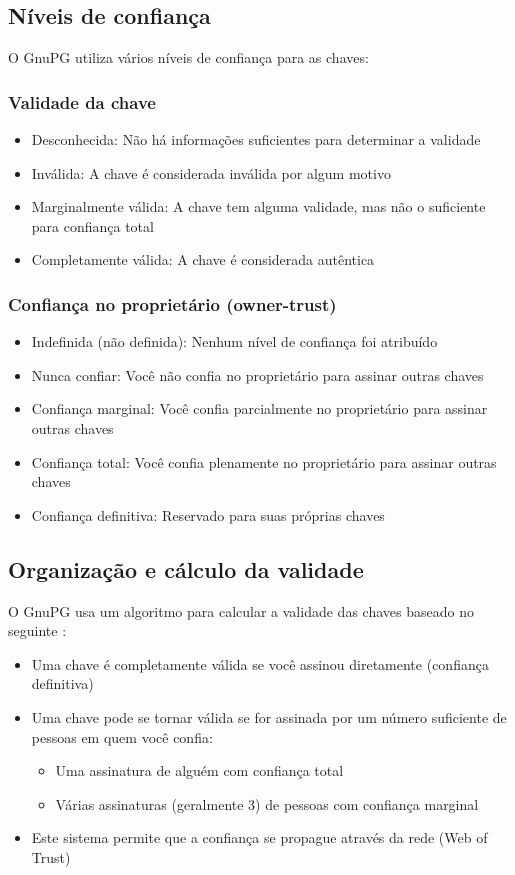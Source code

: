 \subsection{Níveis de confiança}
O GnuPG utiliza vários níveis de confiança para as chaves:

\subsubsection{Validade da chave}
\begin{itemize}
    \item Desconhecida: Não há informações suficientes para determinar a validade
    \item Inválida: A chave é considerada inválida por algum motivo
    \item Marginalmente válida: A chave tem alguma validade, mas não o suficiente para confiança total
    \item Completamente válida: A chave é considerada autêntica
\end{itemize}

\subsubsection{Confiança no proprietário (owner-trust)}
\begin{itemize}
    \item Indefinida (não definida): Nenhum nível de confiança foi atribuído
    \item Nunca confiar: Você não confia no proprietário para assinar outras chaves
    \item Confiança marginal: Você confia parcialmente no proprietário para assinar outras chaves
    \item Confiança total: Você confia plenamente no proprietário para assinar outras chaves
    \item Confiança definitiva: Reservado para suas próprias chaves
\end{itemize}

\subsection{Organização e cálculo da validade}
O GnuPG usa um algoritmo para calcular a validade das chaves baseado no seguinte \cite{gnupgwot}:

\begin{itemize}
    \item Uma chave é completamente válida se você assinou diretamente (confiança definitiva)
    \item Uma chave pode se tornar válida se for assinada por um número suficiente de pessoas em quem você confia:
    \begin{itemize}
        \item Uma assinatura de alguém com confiança total
        \item Várias assinaturas (geralmente 3) de pessoas com confiança marginal
    \end{itemize}
    \item Este sistema permite que a confiança se propague através da rede (Web of Trust)
\end{itemize}

